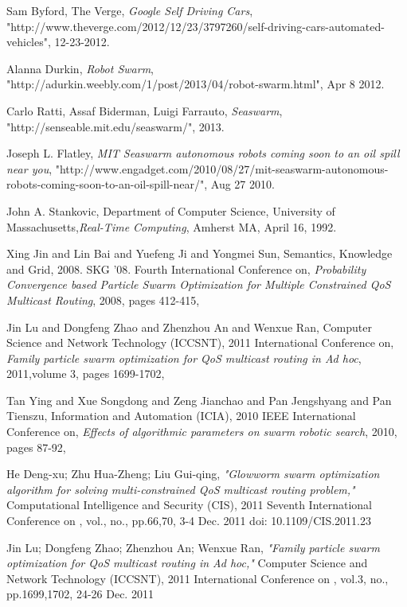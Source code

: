 \documentclass[journal]{IEEEtran}
\begin{document}
\ifCLASSOPTIONcaptionsoff
  \newpage
\fi
\begin{thebibliography}{1}

Sam Byford, The Verge, \emph{Google Self Driving Cars}, "http://www.theverge.com/2012/12/23/3797260/self-driving-cars-automated-vehicles", 12-23-2012.

Alanna Durkin, \emph{Robot Swarm}, "http://adurkin.weebly.com/1/post/2013/04/robot-swarm.html", Apr 8 2012.

Carlo Ratti, Assaf Biderman, Luigi Farrauto, \emph{Seaswarm}, "http://senseable.mit.edu/seaswarm/", 2013.

Joseph L. Flatley, \emph{MIT Seaswarm autonomous robots coming soon to an oil spill near you},
"http://www.engadget.com/2010/08/27/mit-seaswarm-autonomous-robots-coming-soon-to-an-oil-spill-near/", Aug 27 2010.

John A. Stankovic, Department of Computer Science, University of Massachusetts,\emph{Real-Time Computing}, Amherst MA, April 16, 1992.

Xing Jin and Lin Bai and Yuefeng Ji and Yongmei Sun,
Semantics, Knowledge and Grid, 2008. SKG '08. Fourth International Conference on, \emph{Probability Convergence based Particle Swarm Optimization for Multiple Constrained QoS Multicast Routing},
2008, pages 412-415,

Jin Lu and Dongfeng Zhao and Zhenzhou An and Wenxue Ran,
Computer Science and Network Technology (ICCSNT), 2011 International Conference on, \emph{Family particle swarm optimization for QoS multicast routing in Ad hoc},
2011,volume 3, pages 1699-1702,

Tan Ying and Xue Songdong and Zeng Jianchao and Pan Jengshyang and Pan Tienszu,
Information and Automation (ICIA), 2010 IEEE International Conference on, \emph{Effects of algorithmic parameters on swarm robotic search},
2010, pages 87-92,

He Deng-xu; Zhu Hua-Zheng; Liu Gui-qing, \emph{"Glowworm swarm optimization algorithm for solving multi-constrained QoS multicast routing problem,"} Computational Intelligence and Security (CIS), 2011 Seventh International Conference on , vol., no., pp.66,70, 3-4 Dec. 2011
doi: 10.1109/CIS.2011.23

Jin Lu; Dongfeng Zhao; Zhenzhou An; Wenxue Ran, \emph{"Family particle swarm optimization for QoS multicast routing in Ad hoc,"} Computer Science and Network Technology (ICCSNT), 2011 International Conference on , vol.3, no., pp.1699,1702, 24-26 Dec. 2011


\end{thebibliography}
\end{document}
